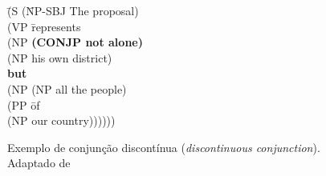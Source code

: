 \begin{figure}[!h]
    \centering
    \begin{minipage}{10cm}
        \begin{tabbing}
            \=(S (\=NP-SBJ The proposal)\+\\
                \>(VP \=represents\+\\
                    \>(NP \=\textbf{(CONJP not alone)}\+\\
                    \>(NP his own district)\\
                    \>\textbf{but}\\
                    \>(NP (NP all the people)\\
                    \>(PP \=of\\
                        \>(NP our country))))))\\
        \end{tabbing}
    \end{minipage}
    \caption[Exemplo de conjunção descontínua]{Exemplo de conjunção discontínua (\textit{discontinuous conjunction}). Adaptado de }
    \label{fig:ptb_conj_exe_3}
\end{figure}